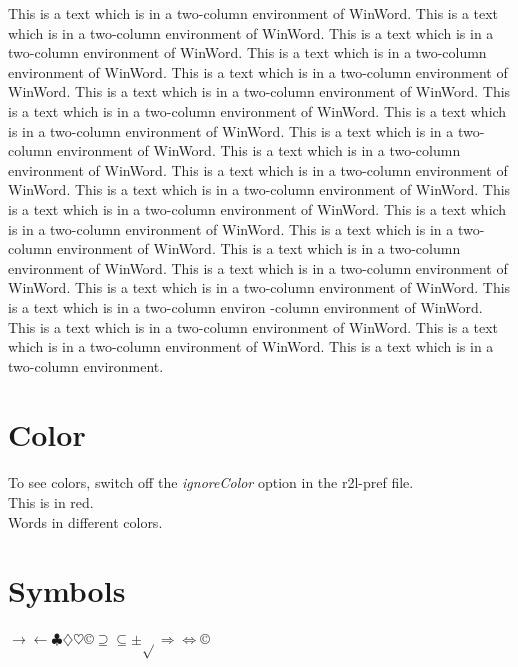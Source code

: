 \documentclass{article}
\begin{document}
\begin{multicols}{2}
This is a text which is in a two-column environment of WinWord. 
This is a text which is in a two-column environment of WinWord. 
This is a text which is in a two-column environment of WinWord. 
This is a text which is in a two-column environment of WinWord. 
This is a text which is in a two-column environment of WinWord. 
This is a text which is in a two-column environment of WinWord. 
This is a text which is in a two-column environment of WinWord. 
This is a text which is in a two-column environment of WinWord. 
This is a text which is in a two-column environment of WinWord. 
This is a text which is in a two-column environment of WinWord. 
This is a text which is in a two-column environment of WinWord. 
This is a text which is in a two-column environment of WinWord. 
This is a text which is in a two-column environment of WinWord. 
This is a text which is in a two-column environment of WinWord. 
This is a text which is in a two-column environment of WinWord. 
This is a text which is in a two-column environment of WinWord. 
This is a text which is in a two-column environment of WinWord. 
This is a text which is in a two-column environment of WinWord. 
This is a text which is in a two-column environ -column environment 
of WinWord. This is a text which is in a two-column environment 
of WinWord. This is a text which is in a two-column environment 
of WinWord. This is a text which is in a two-column environment.



\section*{
}

\end{multicols}


\section*{Color}
To see colors, switch off the \textit{ignoreColor} option in the r2l-pref 
file.\\{}
This is in red.\\{}
Words in different colors.



\section*{Symbols}
\ensuremath{\rightarrow}\ensuremath{\leftarrow}\ensuremath{\clubsuit}\ensuremath{\diamondsuit}\ensuremath{\heartsuit}{\texttrademark}{\copyright}\ensuremath{\supseteq}\ensuremath{\subseteq}\ensuremath{\pm}\ensuremath{\sqrt{}}\ensuremath{\Rightarrow}\ensuremath{\Leftrightarrow}{\copyright}
\end{document}
